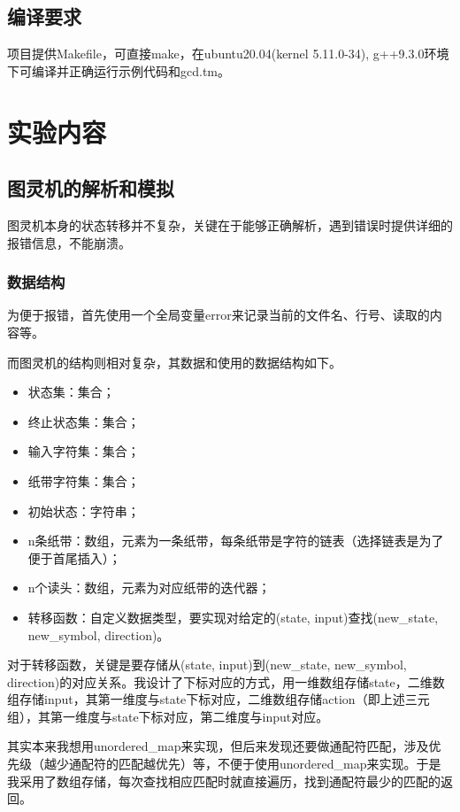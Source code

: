 \documentclass[11pt,a4paper,UTF8]{article}
\begin{document}
\subsection{编译要求}
\par 项目提供Makefile，可直接make，在ubuntu20.04(kernel 5.11.0-34), g++9.3.0环境下可编译并正确运行示例代码和gcd.tm。

\section{实验内容}
\subsection{图灵机的解析和模拟}
图灵机本身的状态转移并不复杂，关键在于能够正确解析，遇到错误时提供详细的报错信息，不能崩溃。
\subsubsection{数据结构}
为便于报错，首先使用一个全局变量error来记录当前的文件名、行号、读取的内容等。

\par 而图灵机的结构则相对复杂，其数据和使用的数据结构如下。
\begin{itemize}
	\item 状态集：集合；
	\item 终止状态集：集合；
	\item 输入字符集：集合；
	\item 纸带字符集：集合；
	\item 初始状态：字符串；
	\item n条纸带：数组，元素为一条纸带，每条纸带是字符的链表（选择链表是为了便于首尾插入）；
	\item n个读头：数组，元素为对应纸带的迭代器；
	\item 转移函数：自定义数据类型，要实现对给定的(state, input)查找(new\_state, new\_symbol, direction)。
\end{itemize}

\par 对于转移函数，关键是要存储从(state, input)到(new\_state, new\_symbol, direction)的对应关系。我设计了下标对应的方式，用一维数组存储state，二维数组存储input，其第一维度与state下标对应，二维数组存储action（即上述三元组），其第一维度与state下标对应，第二维度与input对应。

\par 其实本来我想用unordered\_map来实现，但后来发现还要做通配符匹配，涉及优先级（越少通配符的匹配越优先）等，不便于使用unordered\_map来实现。于是我采用了数组存储，每次查找相应匹配时就直接遍历，找到通配符最少的匹配的返回。

\end{document}
